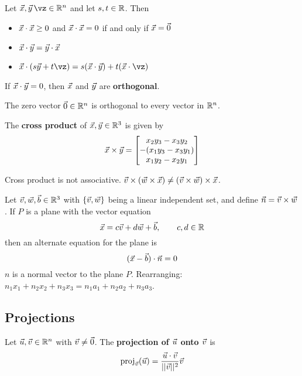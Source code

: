 \documentclass[english, 12pt]{article}
\begin{document}
\begin{thrm}
Let $\vx,\vy\,\vz \in \R^n$ and let $s,t \in {\mathbb{R}}$. Then
\begin{itemize}
\item $\vec{x} \cdot \vec{x} \geq 0$ and $\vec{x} \cdot \vec{x} = 0$ if and only if $\vec{x} = \vec{0}$
\item $\vec{x} \cdot \vec{y} = \vec{y} \cdot \vec{x}$
\item $\vx \cdot (s\vy + t \vz) = s (\vx \cdot \vy) + t (\vx \cdot \vz)$
\end{itemize}
\end{thrm}

\begin{thrm}
If $\vec{x} \cdot \vec{y} = 0$, then $\vec{x}$ and $\vec{y}$ are \textbf{orthogonal}.
\end{thrm}

\begin{qte}
The zero vector $\vec{0} \in {\mathbb{R}}^n$ is orthogonal to every vector in ${\mathbb{R}}^n$.
\end{qte}

\begin{thrm}
The \textbf{cross product} of $\vec{x},\vec{y} \in {\mathbb{R}}^3$ is given by
\[\vec{x} \times \vec{y} =
\begin{bmatrix}
x_{2}y_{3} - x_{3} y_{2} \\
- (x_{1} y_{3} - x_{3} y_{1}) \\
x_{1} y_{2} - x_{2} y_{1}
\end{bmatrix}\]
\end{thrm}

\begin{qte}
Cross product is not associative. $\vec{v} \times (\vec{w} \times \vec{x}) \neq (\vec{v} \times \vec{w}) \times \vec{x}$.
\end{qte}

\begin{thrm}
Let $\vec{v},\vec{w}, \vec{b} \in {\mathbb{R}}^3$ with $\{\vec{v},\vec{w}\}$ being a linear independent set, and define $\vec{n} = \vec{v} \times \vec{w}$. If $P$ is a plane with the vector equation
\[ \vec{x} = c \vec{v} + d \vec{w} + \vec{b}, \qquad c,d \in {\mathbb{R}}\]
then an alternate equation for the plane is
\[(\vec{x} - \vec{b}) \cdot \vec{n} = 0\]
$n$ is a normal vector to the plane $P$.
Rearranging: $n_{1} x_{1} + n_{2} x_{2} + n_{3} x_{3} = n_{1} a_{1} + n_{2} a_{2} + n_{3} a_{3}$.
\end{thrm}

\subsection{Projections}
\begin{defn}
Let $\vec{u},\vec{v} \in {\mathbb{R}}^n$ with $\vec{v} \neq \vec{0}$. The \textbf{projection of $\vec{u}$ onto $\vec{v}$} is
\[\operatorname{proj}_{\vec{v}} (\vec{u}) = \frac{\vec{u} \cdot \vec{v}}{||\vec{v}||^2} \vec{v}\]
\end{defn}
\end{document}
